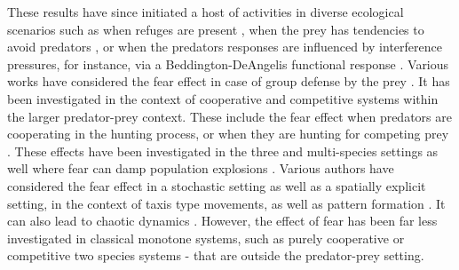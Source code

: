 \documentclass[10pt]{amsart}
\theoremstyle{definition}
\begin{document}
These results have since initiated a host of activities in diverse ecological scenarios such as when refuges are present \cite{Wang19, Zhang19}, when the prey has tendencies to avoid predators \cite{Wang17}, or when the predators responses are influenced by interference pressures, for instance, via a Beddington-DeAngelis functional response \cite{Palb19}. Various works have considered the fear effect in case of group defense by the prey \cite{Das_Sam21, Das21}.
 It has been investigated in the context of cooperative and competitive systems within the larger predator-prey context. These include the fear effect when predators are cooperating \cite{Pal19} in the hunting process, or when they are hunting for competing prey \cite{Yousef22}. These effects have been investigated in the three and multi-species settings as well \cite{Pandey18, Panday19} where fear can damp population explosions \cite{Verma21}. Various authors have considered the fear effect in a stochastic setting \cite{Das18} as well as a spatially explicit setting, in the context of taxis type movements, as well as pattern formation \cite{Wu18, Wang18}. It can also lead to chaotic dynamics \cite{Duan19}. However, the effect of fear has been far less investigated in classical monotone systems, such as purely cooperative or competitive two species systems - that are outside the predator-prey setting. 
 
\end{document}
